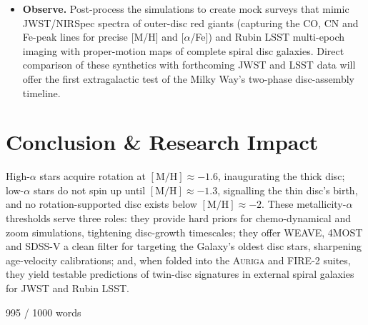 \documentclass[a4paper,10pt]{article}
\begin{document}
\begin{multicols}{2}
\begin{itemize}
  \item \textbf{Observe.}  
        Post-process the simulations to create mock surveys that mimic JWST/NIRSpec spectra of outer-disc red giants
        (capturing the CO, CN and Fe-peak lines for precise [M/H] and [$\alpha$/Fe]) and Rubin LSST multi-epoch imaging with proper-motion maps of
        complete spiral disc galaxies.  Direct comparison of these synthetics with forthcoming JWST and LSST data will offer the
        first extragalactic test of the Milky Way's two-phase disc-assembly timeline.

\end{itemize}

\section*{Conclusion \& Research Impact}

High-$\alpha$ stars acquire rotation at $\mathrm{[M/H]}\approx-1.6$, inaugurating the thick disc; 
low-$\alpha$ stars do not spin up until $\mathrm{[M/H]}\approx-1.3$, signalling the thin disc's 
birth, and no rotation-supported disc exists below $\mathrm{[M/H]}\approx-2$.  These 
metallicity-$\alpha$ thresholds serve three roles: they provide hard priors for chemo-dynamical 
and zoom simulations, tightening disc-growth timescales; they offer WEAVE, 4MOST and SDSS-V a 
clean filter for targeting the Galaxy's oldest disc stars, sharpening age-velocity calibrations; 
and, when folded into the \textsc{Auriga} and \textsc{FIRE-2} suites, they yield testable predictions 
of twin-disc signatures in external spiral galaxies for JWST and Rubin LSST.



\newpage{}

995 / 1000 words








  


\end{multicols}
\end{document}
